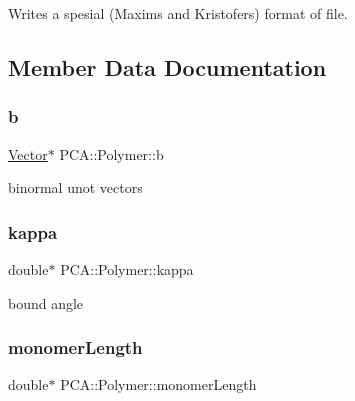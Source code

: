 Writes a spesial (Maxim\textquotesingle{}s and Kristofer\textquotesingle{}s) format of file. 



\subsection{Member Data Documentation}
\hypertarget{class_p_c_a_1_1_polymer_ad93199b0187ab557476153b204b921c7}{}\label{class_p_c_a_1_1_polymer_ad93199b0187ab557476153b204b921c7} 
\subsubsection{\texorpdfstring{b}{b}}
{\footnotesize\ttfamily \hyperlink{class_p_c_a_1_1_vector}{Vector}$\ast$ P\+C\+A\+::\+Polymer\+::b\hspace{0.3cm}{\ttfamily [private]}}



binormal unot vectors 

\hypertarget{class_p_c_a_1_1_polymer_a1bef29f1613bb4b67981aae7df3d804b}{}\label{class_p_c_a_1_1_polymer_a1bef29f1613bb4b67981aae7df3d804b} 
\subsubsection{\texorpdfstring{kappa}{kappa}}
{\footnotesize\ttfamily double$\ast$ P\+C\+A\+::\+Polymer\+::kappa\hspace{0.3cm}{\ttfamily [private]}}



bound angle 

\hypertarget{class_p_c_a_1_1_polymer_adec33c5274834c85479abefe537efa5a}{}\label{class_p_c_a_1_1_polymer_adec33c5274834c85479abefe537efa5a} 
\subsubsection{\texorpdfstring{monomer\+Length}{monomerLength}}
{\footnotesize\ttfamily double$\ast$ P\+C\+A\+::\+Polymer\+::monomer\+Length\hspace{0.3cm}{\ttfamily [private]}}



